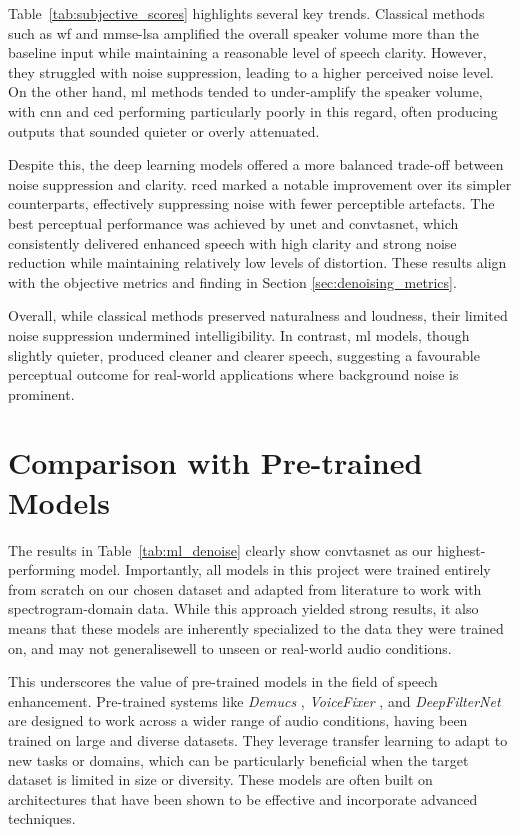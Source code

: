 Table~\ref{tab:subjective_scores} highlights several key trends. Classical methods such as \gls{wf} and \gls{mmse-lsa} amplified the overall speaker volume more than the baseline input while maintaining a reasonable level of speech clarity. However, they struggled with noise suppression, leading to a higher perceived noise level. On the other hand, \gls{ml} methods tended to under-amplify the speaker volume, with \gls{cnn} and \gls{ced} performing particularly poorly in this regard, often producing outputs that sounded quieter or overly attenuated.

Despite this, the deep learning models offered a more balanced trade-off between noise suppression and clarity. \gls{rced} marked a notable improvement over its simpler counterparts, effectively suppressing noise with fewer perceptible artefacts. The best perceptual performance was achieved by \gls{unet} and \gls{convtasnet}, which consistently delivered enhanced speech with high clarity and strong noise reduction while maintaining relatively low levels of distortion. These results align with the objective metrics and finding in Section \ref{sec:denoising_metrics}.

Overall, while classical methods preserved naturalness and loudness, their limited noise suppression undermined intelligibility. In contrast, \gls{ml} models, though slightly quieter, produced cleaner and clearer speech, suggesting a favourable perceptual outcome for real-world applications where background noise is prominent.

\section{Comparison with Pre-trained Models}
\label{sec:pretrained_comparison}

The results in Table~\ref{tab:ml_denoise} clearly show \gls{convtasnet} as our highest-performing model. Importantly, all models in this project were trained entirely from scratch on our chosen dataset and adapted from literature to work with spectrogram-domain data. While this approach yielded strong results, it also means that these models are inherently specialized to the data they were trained on, and may not generalisewell to unseen or real-world audio conditions.

This underscores the value of pre-trained models in the field of speech enhancement. Pre-trained systems like \textit{Demucs} \cite{defossez2019demucs}, \textit{VoiceFixer} \cite{li2022voicefixer}, and \textit{DeepFilterNet} \cite{meyer2022deepfilternet} are designed to work across a wider range of audio conditions, having been trained on large and diverse datasets. They leverage transfer learning to adapt to new tasks or domains, which can be particularly beneficial when the target dataset is limited in size or diversity. These models are often built on architectures that have been shown to be effective and incorporate advanced techniques.

